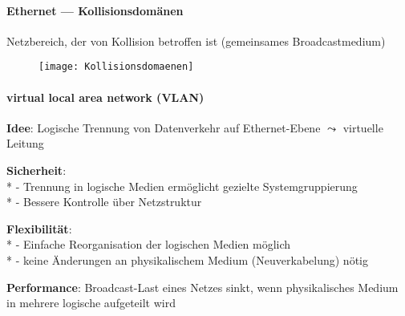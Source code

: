 \paragraph{Ethernet --- Kollisionsdomänen}
\begin{items}
  \item Netzbereich, der von Kollision betroffen ist (gemeinsames Broadcastmedium)
\end{items}
\begin{figure}[H]\centering\label{Kollisionsdomaenen}\texttt{[image: Kollisionsdomaenen]}\end{figure}

\paragraph{virtual local area network (VLAN)}
\begin{items}
  \item \textbf{Idee}: Logische Trennung von Datenverkehr auf Ethernet-Ebene \( \leadsto \) virtuelle Leitung
  \item \textbf{Sicherheit}: \\*
    - Trennung in logische Medien ermöglicht gezielte Systemgruppierung \\*
    - Bessere Kontrolle über Netzstruktur
  \item \textbf{Flexibilität}: \\*
    - Einfache Reorganisation der logischen Medien möglich \\*
    - keine Änderungen an physikalischem Medium (Neuverkabelung) nötig
  \item \textbf{Performance}: Broadcast-Last eines Netzes sinkt, wenn physikalisches Medium in mehrere logische aufgeteilt wird
\end{items}

